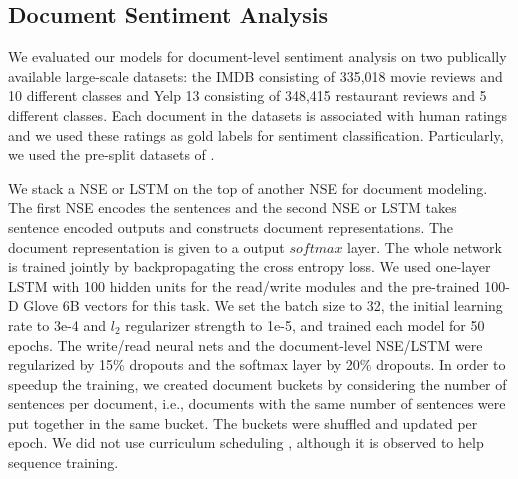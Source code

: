 \documentclass{article}
\begin{document}
\subsection{Document Sentiment Analysis}

We evaluated our models for document-level sentiment analysis on two publically available large-scale datasets: the IMDB  consisting of 335,018 movie reviews and 10 different classes and Yelp 13 consisting of 348,415 restaurant reviews and 5 different classes. Each document in the datasets is associated with human ratings and we used these ratings as gold labels for sentiment classification. Particularly, we used the pre-split datasets of \cite{tang:15}. 


We stack a NSE or LSTM on the top of another NSE for document modeling. The first NSE encodes the sentences and the second NSE or LSTM takes sentence encoded outputs and constructs document representations. The document representation is given to a output $softmax$ layer. The whole network is trained jointly by backpropagating the cross entropy loss. We used one-layer LSTM with 100 hidden units for the read/write modules and the pre-trained 100-D Glove 6B vectors for this task. We set the batch size to 32, the initial learning rate to 3e-4 and $l_2$ regularizer strength to 1e-5, and trained each model for 50 epochs. The write/read neural nets and the document-level NSE/LSTM were regularized by 15\% dropouts and the softmax layer by 20\% dropouts. In order to speedup the training, we created document buckets by considering the number of sentences per document, i.e., documents with the same number of sentences were put together in the same bucket. The buckets were shuffled and updated per epoch. We did not use curriculum scheduling \cite{bengio2009curriculum}, although it is observed to help sequence training.
\end{document}
